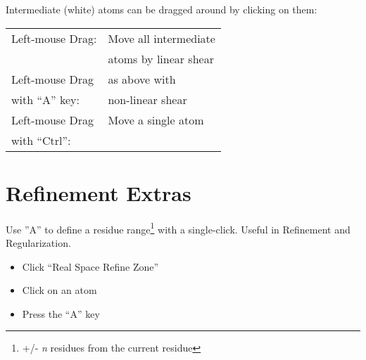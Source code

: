 \documentclass[twocolumn]{article}
\begin{document}
  \vspace{5mm}
  Intermediate (white) atoms can be dragged around by clicking on
  them:

  \vspace{5mm}
\begin{tabular}{ll}
 Left-mouse Drag:     & Move all intermediate \\
                      & atoms by linear shear \\
 Left-mouse Drag  & as above with\\
  with ``A'' key:
                                 &  non-linear shear\\
 Left-mouse Drag & Move a single atom\\
 with ``Ctrl'': 
\end{tabular}

\section{Refinement Extras}
Use ''A'' to define a residue range\footnote{+/- \emph{n} residues
  from the current residue} with a single-click. Useful in Refinement
and Regularization.

\begin{itemize}
\item Click ``Real Space Refine Zone''
\item Click on an atom
\item Press the ``A'' key
\end{itemize}
\end{document}
